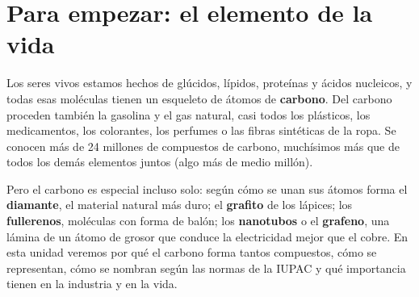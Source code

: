 
\sloppy %

\section*{Para empezar: el elemento de la vida}

Los seres vivos estamos hechos de glúcidos, lípidos, proteínas y ácidos nucleicos, y todas esas moléculas tienen un esqueleto de
átomos de \textbf{carbono}. Del carbono proceden también la gasolina y el gas natural, casi todos los plásticos, los medicamentos,
los colorantes, los perfumes o las fibras sintéticas de la ropa. Se conocen más de 24 millones de compuestos de carbono, muchísimos
más que de todos los demás elementos juntos (algo más de medio millón).

Pero el carbono es especial incluso solo: según cómo se unan sus átomos forma el \textbf{diamante}, el material natural más duro; el
\textbf{grafito} de los lápices; los \textbf{fullerenos}, moléculas con forma de balón; los \textbf{nanotubos} o el
\textbf{grafeno}, una lámina de un átomo de grosor que conduce la electricidad mejor que el cobre. En esta unidad veremos por qué
el carbono forma tantos compuestos, cómo se representan, cómo se nombran según las normas de la IUPAC y qué importancia tienen en la
industria y en la vida.

